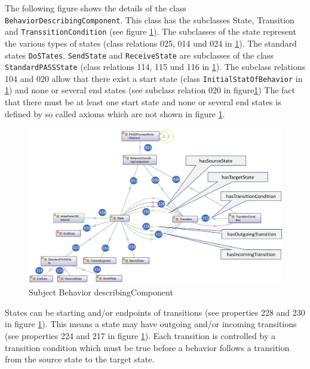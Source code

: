 The following figure shows the details of the class \texttt{BehaviorDescribingComponent}. This class has the subclasses State, Transition and \texttt{TranssitionCondition} (see figure \ref{fig:20190104-behavior-describing-component}). The subclasses of the state represent the various types of states (class relations 025, 014 und 024 in \ref{fig:20190104-behavior-describing-component}). The standard states \texttt{DoSTates}, \texttt{SendState} and \texttt{ReceiveState} are subclasses of the class \texttt{StandardPASSState} (class relations 114, 115 und 116 in \ref{fig:20190104-behavior-describing-component}). The subclass relations 104 and 020 allow that there exist a start state (class \texttt{InitialStatOfBehavior} in \ref{fig:20190104-behavior-describing-component}) and none or several end states (see subclass relation 020 in figure\ref{fig:20190104-behavior-describing-component}) The fact that there must be at least one start state and none or several end states is defined by so called axioms which are not shown in figure \ref{fig:20190104-behavior-describing-component}.

\begin{figure}[htbp]
	\centering
	\includegraphics[width=1.0\linewidth]{Figures/Ontology/SubjectExecution/20190104-Behavior-describing-component}
	\caption[Subject Behavior describingComponent]{Subject Behavior describingComponent}
	\label{fig:20190104-behavior-describing-component}
\end{figure}

States can be starting and/or endpoints of transitions (see properties 228 and 230 in figure \ref{fig:20190104-behavior-describing-component}). This means a state may have outgoing and/or incoming transitions (see properties 224 and 217 in figure \ref{fig:20190104-behavior-describing-component}). Each transition is controlled by a transition condition which must be true before a behavior follows a transition from the source state to the target state.

